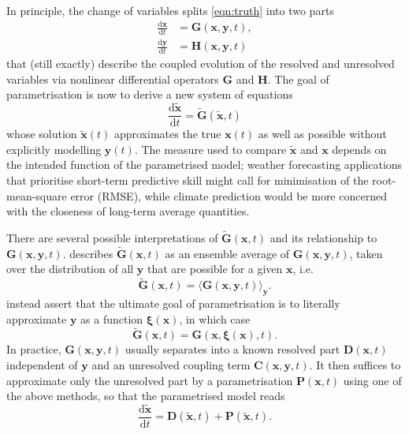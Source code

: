 \documentclass[titlepage,twoside]{article}
\numberwithin{equation}{section}
\newcommand{\diff}[2]{\frac{\mathrm{d} #1}{\mathrm{d} #2}}
\renewcommand\vec{\bm}
\begin{document}
In principle, the change of variables splits \cref{eqn:truth}
into two parts
\begin{align*}
    \diff{\vec{x}}{t} &= \vec{G}(\vec{x},\vec{y},t), \\
    \diff{\vec{y}}{t} &= \vec{H}(\vec{x},\vec{y},t)
\end{align*}
that (still exactly) describe the coupled evolution of the resolved and
unresolved variables via nonlinear differential operators $\vec{G}$ and
$\vec{H}$. The goal of parametrisation is now to derive a new system of
equations
\begin{equation*}
    \diff{\tilde{\vec{x}}}{t} = \tilde{\vec{G}}(\tilde{\vec{x}},t)
\end{equation*}
whose solution $\tilde{\vec{x}}(t)$ approximates the true $\vec{x}(t)$ as well
as possible without explicitly modelling $\vec{y}(t)$. The measure used to
compare $\tilde{\vec{x}}$ and $\vec{x}$ depends on the intended function of the
parametrised model; weather forecasting applications that prioritise short-term
predictive skill might call for minimisation of the root-mean-square error
(RMSE), while climate prediction would be more concerned with the closeness of
long-term average quantities.

There are several possible interpretations of $\tilde{\vec{G}}(\vec{x},t)$ and
its relationship to $\vec{G}(\vec{x},\vec{y},t)$. \textcite{hasselmann1976}
describes $\tilde{\vec{G}}(\vec{x},t)$ as an ensemble average of
$\vec{G}(\vec{x},\vec{y},t)$, taken over the distribution of all $\vec{y}$ that
are possible for a given $\vec{x}$, i.e.
\begin{equation*}
    \tilde{\vec{G}}(\vec{x},t)
        = \langle \vec{G}(\vec{x},\vec{y},t) \rangle_{\vec{y}}.
\end{equation*}
\textcite{demaeyer2018} instead assert that the ultimate goal of
parametrisation is to literally approximate $\vec{y}$ as a function
$\vec{\xi}(\vec{x})$, in which case
\begin{equation*}
    \tilde{\vec{G}}(\vec{x},t)
        = \vec{G}(\vec{x},\vec{\xi}(\vec{x}),t).
\end{equation*}
In practice, $\vec{G}(\vec{x},\vec{y},t)$ usually separates into a known
resolved part $\vec{D}(\vec{x},t)$ independent of $\vec{y}$ and an unresolved
coupling term $\vec{C}(\vec{x},\vec{y},t)$. It then suffices to approximate
only the unresolved part by a parametrisation $\vec{P}(\vec{x}, t)$ using one
of the above methods, so that the parametrised model reads
\begin{equation} \label{eqn:parametrised_model}
    \diff{\tilde{\vec{x}}}{t}
        = \vec{D}(\tilde{\vec{x}},t) + \vec{P}(\tilde{\vec{x}}, t).
\end{equation}
\end{document}
